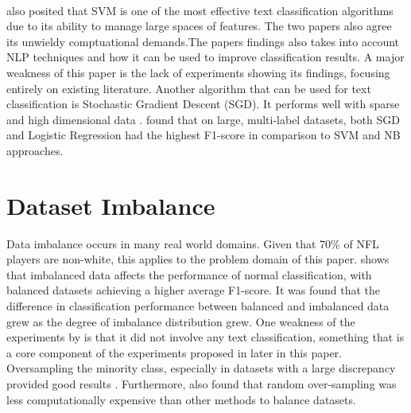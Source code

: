 \documentclass[oneside,12pt]{Classes/RoboticsLaTeX}
\begin{document}
\paragraph{}
\citet{Dharmadhikari2011EmpiricalSO} also posited that SVM is one of the most effective text classification algorithms due to its ability to manage large spaces of features. The two papers also agree its unwieldy comptuational 
demands.The papers findings also takes into account NLP techniques and how it can be used to improve classification results. A major weakness of this paper is the lack of experiments showing its findings, focusing entirely on existing literature. Another
algorithm that can be used for text classification is Stochastic Gradient Descent (SGD). It performs well with sparse and high dimensional data \citep{SVM_SGD}. \citet{Arabic_SGD_LR} found that on large, multi-label datasets, both SGD and Logistic Regression
had the highest F1-score in comparison to SVM and NB approaches.

\section{Dataset Imbalance}
Data imbalance occurs in many real world domains. Given that 70\% of NFL players are non-white, this applies to the problem domain of this paper. \citet{imbalanced_data} shows that imbalanced data affects the performance of normal classification, with balanced 
datasets achieving a higher average F1-score. It was found that the difference in classification performance between balanced and imbalanced data grew as the degree of imbalance distribution grew. One weakness of the experiments by \citet{imbalanced_data} 
is that it did not involve any text classification, something that is a core component of the experiments proposed in later in this paper. Oversampling the minority class, especially in datasets with a large discrepancy provided good results \citep{BalancingMethods}.
Furthermore, \citet{BalancingMethods} also found that random over-sampling was less computationally expensive than other methods to balance datasets. 
\end{document}
